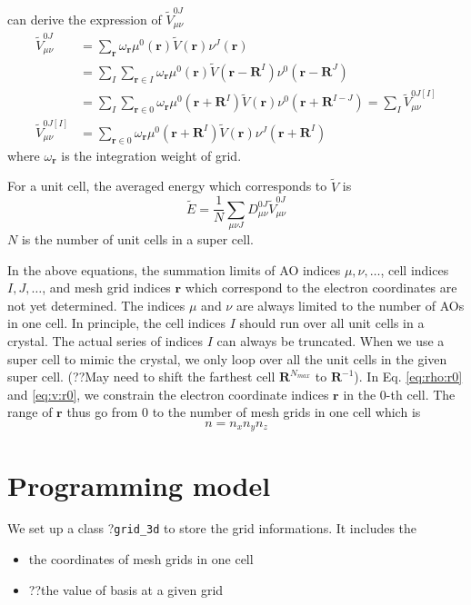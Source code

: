 \documentclass{article}
\begin{document}
can derive the expression of $\tilde{V}_{\mu\nu}^{0J}$
\begin{align}
  \tilde{V}_{\mu\nu}^{0J}
  &=\sum_{\mathbf{r}} \omega_\mathbf{r}
  \mu^0(\mathbf{r})\tilde{V}(\mathbf{r})\nu^J(\mathbf{r})
  \\
  &=\sum_{I}\sum_{\mathbf{r}\in I} \omega_\mathbf{r} \mu^0(\mathbf{r})
  \tilde{V}(\mathbf{r} - \mathbf{R}^I)\nu^0(\mathbf{r}-\mathbf{R}^J)
  \\
  &=\sum_{I}\sum_{\mathbf{r}\in 0} \omega_\mathbf{r}
  \mu^0(\mathbf{r}+\mathbf{R}^I)
  \tilde{V}(\mathbf{r})\nu^0(\mathbf{r} + \mathbf{R}^{I-J})
  =\sum_I \tilde{V}_{\mu\nu}^{0J[I]}
  \label{eq:v:r0} \\
  \tilde{V}_{\mu\nu}^{0J[I]}
  &=\sum_{\mathbf{r}\in 0} \omega_\mathbf{r} \mu^0(\mathbf{r}+\mathbf{R}^I)
  \tilde{V}(\mathbf{r})\nu^J(\mathbf{r} + \mathbf{R}^{I})
\end{align}
where $\omega_\mathbf{r}$ is the integration weight of grid.

For a unit cell, the averaged energy which corresponds to $\tilde{V}$ is
\begin{equation}
  \tilde{E} = \frac{1}{N}\sum_{\mu\nu J} D_{\mu\nu}^{0J} \tilde{V}_{\mu\nu}^{0J}
  \label{}
\end{equation}
$N$ is the number of unit cells in a super cell.

In the above equations, the summation limits of AO indices $\mu,\nu,\dots$,
cell indices $I,J,\dots$, and mesh grid indices $\mathbf{r}$ which correspond
to the electron coordinates are not yet determined.
The indices $\mu$ and $\nu$ are always limited to the number of AOs in one cell.
In principle, the cell indices $I$ should run over all unit cells in a
crystal.  The actual series of indices $I$ can always be truncated.
When we use a super cell to mimic the crystal,
we only loop over all the unit cells in the given super cell.
(??May need to shift the farthest cell $\mathbf{R}^{N_{max}}$ to
$\mathbf{R}^{-1}$).
In Eq. \eqref{eq:rho:r0} and \eqref{eq:v:r0},
we constrain the electron coordinate indices $\mathbf{r}$ in the $0$-th cell.
The range of $\mathbf{r}$ thus go from 0 to the number of mesh grids in one
cell which is
\begin{equation}
  n = n_x n_y n_z
  \label{}
\end{equation}


\section{Programming model}
We set up a class ?\verb$grid_3d$ to store the
grid informations. It includes the
\begin{itemize}
  \item the coordinates of mesh grids in one cell
  \item ??the value of basis at a given grid
\end{itemize}
\end{document}

